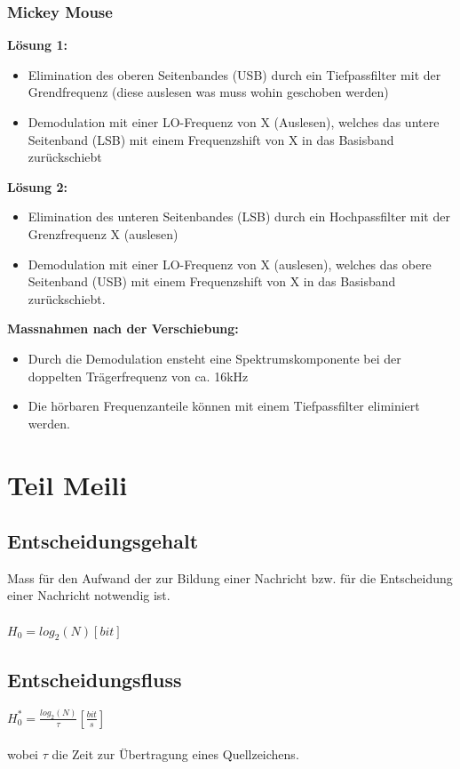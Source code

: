 \subsubsection{Mickey Mouse}
\textbf{Lösung 1:} 
\begin{itemize}
	\item Elimination des oberen Seitenbandes (USB) durch ein Tiefpassfilter mit der Grendfrequenz (diese auslesen was muss wohin geschoben werden)
	\item Demodulation mit einer LO-Frequenz von X (Auslesen), welches das untere Seitenband (LSB) mit einem Frequenzshift von X in das Basisband zurückschiebt
\end{itemize}
\textbf{Lösung 2:}
\begin{itemize}
	\item Elimination des unteren Seitenbandes (LSB) durch ein Hochpassfilter mit der Grenzfrequenz X (auslesen)
	\item Demodulation mit einer LO-Frequenz von X (auslesen), welches das obere Seitenband (USB) mit einem Frequenzshift von X in das Basisband zurückschiebt.
\end{itemize}
\textbf{Massnahmen nach der Verschiebung:} 
\begin{itemize}
	\item Durch die Demodulation ensteht eine Spektrumskomponente bei der doppelten Trägerfrequenz von ca. 16kHz
	\item Die hörbaren Frequenzanteile können mit einem Tiefpassfilter eliminiert werden.
\end{itemize}

\section{Teil Meili}

\subsection{Entscheidungsgehalt}
Mass für den Aufwand der zur Bildung einer Nachricht bzw. für die Entscheidung einer Nachricht notwendig ist.
\\
\\
$H_0=log_2(N)[bit]$

\subsection{Entscheidungsfluss}
$H_0^*=\frac{log_2(N)}{\tau}[\frac{bit}{s}]$ \\
\\
wobei $\tau$ die Zeit zur Übertragung eines Quellzeichens.

